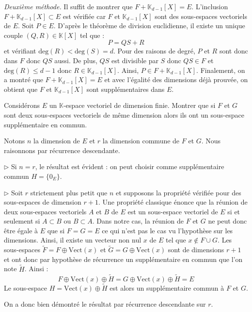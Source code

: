 \documentclass[a4paper,10pt]{report}
\begin{document}
\begin{enumerate}
\noindent \textit{Deuxième méthode.}  Il suffit de montrer que $F + \mathbb{K}_{d-1}[X]=E$. L'inclusion  $ F + \mathbb{K}_{d-1}[X] \subset E$ est vérifiée car $F$ et $\mathbb{K}_{d-1}[X]$ sont des sous-espaces vectoriels de $E$. Soit $P \in E$. D'après le théorème de division euclidienne, il existe un unique couple $(Q,R) \in \mathbb{K}[X]$ tel que :
$$ P = QS+R$$
et vérifiant $\textrm{deg}(R) < \textrm{deg}(S) = d$. Pour des raisons de degré, $P$ et $R$ sont donc dans $F$ donc $QS$ aussi. De plus, $QS$ est divisible par $S$ donc $QS \in F$ et $\textrm{deg}(R) \leq d-1$ donc $R \in \mathbb{K}_{d-1}[X]$. Ainsi, $P \in F + \mathbb{K}_{d-1}[X]$. Finalement, on a montré que $F + \mathbb{K}_{d-1}[X]=E$ et avec l'égalité des dimensions déjà prouvée, on obtient que $F$ et $\mathbb{K}_{d-1}[X]$ sont supplémentaires dans $E$.
\end{enumerate}

\medskip


\begin{Exercice}{} Considérons $E$ un $\mathbb{K}$-espace vectoriel de dimension finie. Montrer que si $F$ et $G$ sont deux sous-espaces vectoriels de même dimension alors ils ont un sous-espace supplémentaire en commun.
\end{Exercice}

\corr Notons $n$ la dimension de $E$ et $r$ la dimension commune de $F$ et $G$. Nous raisonnons par récurrence descendante.

\medskip

\noindent $\rhd$ Si $n=r$, le résultat est évident : on peut choisir comme supplémentaire commun $H = \lbrace 0_E \rbrace$.

\medskip

\noindent $\rhd$ Soit $r$ strictement plus petit que $n$ et supposons la propriété vérifiée pour des sous-espaces de dimension $r+1$. Une propriété classique énonce que la réunion de deux sous-espaces vectoriels $A$ et $B$ de $E$ est un sous-espace vectoriel de $E$ si et seulement si $A \subset B$ ou $B \subset A$. Dans notre cas, la réunion de $F$ et $G$ ne peut donc être égale à $E$ que si $F=G=E$ ce qui n'est pas le cas vu l'hypothèse sur les dimensions. Ainsi, il existe un vecteur non nul $x$ de $E$ tel que $x \notin F \cup G$. Les sous-espaces $\tilde{F}= F \oplus \textrm{Vect}(x)$ et $\tilde{G}= G \oplus \textrm{Vect}(x)$ sont de dimensions $r+1$ et ont donc par hypothèse de récurrence un supplémentaire en commun que l'on note $\tilde{H}$. Ainsi :
$$  F \oplus \textrm{Vect}(x) \oplus \tilde{H} =  G \oplus \textrm{Vect}(x) \oplus \tilde{H} = E$$
Le sous-espace $H=\textrm{Vect}(x) \oplus \tilde{H}$ est alors un supplémentaire commun à $F$ et $G$.

\medskip

\noindent On a donc bien démontré le résultat par récurrence descendante sur $r$.
\end{document}
